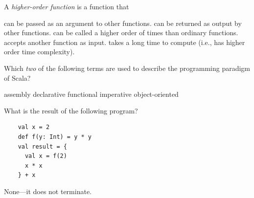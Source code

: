 \begin{questions}
\vskip1cm

  \question[2] A \textit{higher-order function} is a function that
  \begin{checkboxes}
    \choice can be passed as an argument to other functions.
    \choice can be returned as output by other functions.
    \choice can be called a higher order of times than ordinary functions.
    \CorrectChoice accepts another function as input.
    \choice takes a long time to compute (i.e., has higher order time complexity).
  \end{checkboxes}

\vskip1cm

  \question[2]
 Which \textit{two} of the following terms are used to describe the programming paradigm of Scala?

    \begin{oneparcheckboxes}
      \choice assembly
      \choice declarative
      \CorrectChoice functional
      \choice imperative
      \CorrectChoice object-oriented
    \end{oneparcheckboxes}

    \medskip

  \question[3]
 What is the result of the following program?
    \begin{verbatim}
    val x = 2
    def f(y: Int) = y * y
    val result = {
      val x = f(2)
      x * x
    } + x
    \end{verbatim}
    \begin{oneparcheckboxes}
      \choice None---it does not terminate.
    \end{oneparcheckboxes}


\end{questions}
